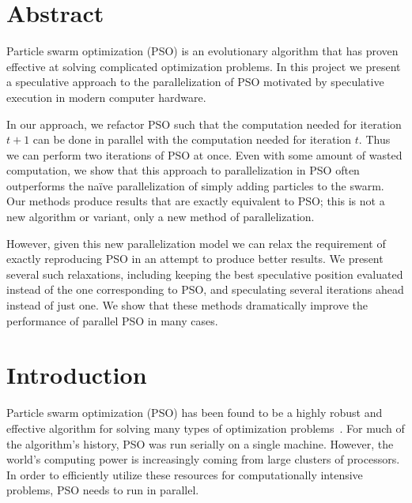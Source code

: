 \documentclass[ms]{byuprop}
\title{\Title}
\author{\Author}
\begin{document}
\maketitle



\section{Abstract}

Particle swarm optimization (PSO) is an evolutionary algorithm that has proven
effective at solving complicated optimization problems.  In this project we
present a speculative approach to the parallelization of PSO motivated by
speculative execution in modern computer hardware.

In our approach, we refactor PSO such that the computation needed for iteration
$t+1$ can be done in parallel with the computation needed for iteration $t$.
Thus we can perform two iterations of PSO at once.  Even with some amount of
wasted computation, we show that this approach to parallelization in PSO often
outperforms the na\"ive parallelization of simply adding particles to the
swarm.  Our methods produce results that are exactly equivalent to PSO; this is
not a new algorithm or variant, only a new method of parallelization.

However, given this new parallelization model we can relax the requirement of
exactly reproducing PSO in an attempt to produce better results.  We present
several such relaxations, including keeping the best speculative position
evaluated instead of the one corresponding to PSO, and speculating several
iterations ahead instead of just one.  We show that these methods dramatically
improve the performance of parallel PSO in many cases.


\section{Introduction}
\label{sec:intro}

Particle swarm optimization (PSO) has been found to be a highly robust and
effective algorithm for solving many types of optimization
problems~\citep{poli-2008-pso-applications}.  For much of the algorithm's
history, PSO was run serially on a single machine.  However, the world's
computing power is increasingly coming from large clusters of processors.  In
order to efficiently utilize these resources for computationally intensive
problems, PSO needs to run in parallel.
\end{document}
